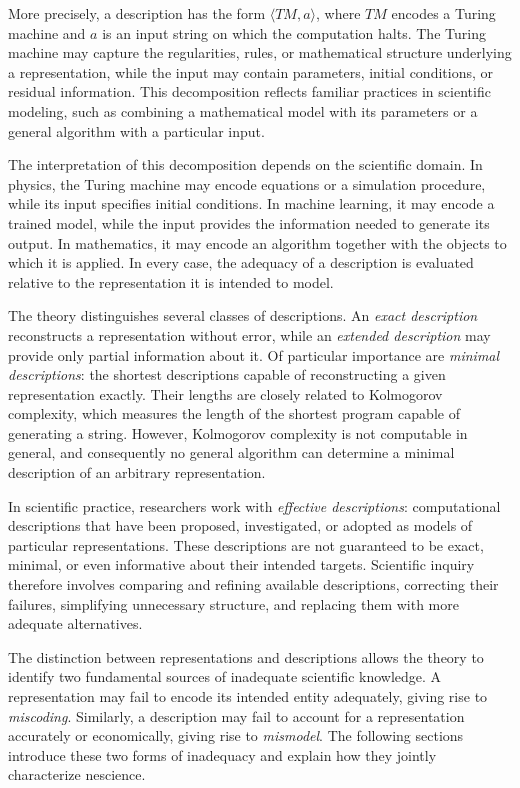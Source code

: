 More precisely, a description has the form $\langle TM,a\rangle$, where $TM$ encodes a Turing machine and $a$ is an input string on which the computation halts. The Turing machine may capture the regularities, rules, or mathematical structure underlying a representation, while the input may contain parameters, initial conditions, or residual information. This decomposition reflects familiar practices in scientific modeling, such as combining a mathematical model with its parameters or a general algorithm with a particular input.

The interpretation of this decomposition depends on the scientific domain. In physics, the Turing machine may encode equations or a simulation procedure, while its input specifies initial conditions. In machine learning, it may encode a trained model, while the input provides the information needed to generate its output. In mathematics, it may encode an algorithm together with the objects to which it is applied. In every case, the adequacy of a description is evaluated relative to the representation it is intended to model.

The theory distinguishes several classes of descriptions. An \emph{exact description} reconstructs a representation without error, while an \emph{extended description} may provide only partial information about it. Of particular importance are \emph{minimal descriptions}: the shortest descriptions capable of reconstructing a given representation exactly. Their lengths are closely related to Kolmogorov complexity, which measures the length of the shortest program capable of generating a string. However, Kolmogorov complexity is not computable in general, and consequently no general algorithm can determine a minimal description of an arbitrary representation.

In scientific practice, researchers work with \emph{effective descriptions}: computational descriptions that have been proposed, investigated, or adopted as models of particular representations. These descriptions are not guaranteed to be exact, minimal, or even informative about their intended targets. Scientific inquiry therefore involves comparing and refining available descriptions, correcting their failures, simplifying unnecessary structure, and replacing them with more adequate alternatives.

The distinction between representations and descriptions allows the theory to identify two fundamental sources of inadequate scientific knowledge. A representation may fail to encode its intended entity adequately, giving rise to \emph{miscoding}. Similarly, a description may fail to account for a representation accurately or economically, giving rise to \emph{mismodel}. The following sections introduce these two forms of inadequacy and explain how they jointly characterize nescience.

